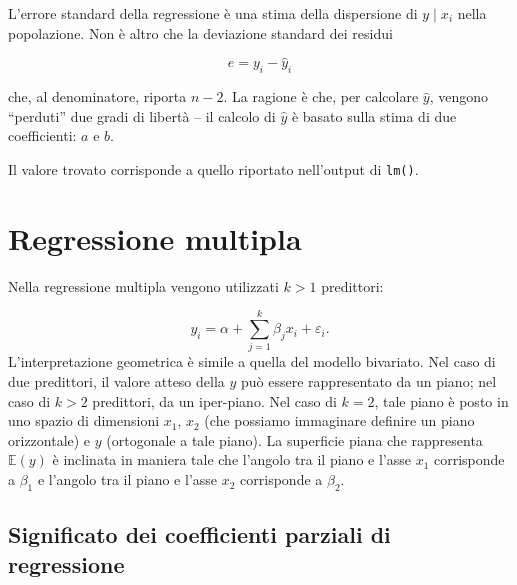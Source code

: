 \documentclass[
  11pt,
]{krantz}
\makeatletter
\newenvironment{Shaded}{\begin{snugshade}}{\end{snugshade}}
\newcommand{\CommentTok}[1]{\textcolor[rgb]{0.37,0.37,0.37}{\textit{#1}}}
\newcommand{\DecValTok}[1]{\textcolor[rgb]{0.06,0.06,0.06}{#1}}
\newcommand{\FunctionTok}[1]{\textcolor[rgb]{0,0,0}{#1}}
\newcommand{\NormalTok}[1]{#1}
\newcommand{\OtherTok}[1]{\textcolor[rgb]{0.37,0.37,0.37}{#1}}
\newcommand{\SpecialCharTok}[1]{\textcolor[rgb]{0,0,0}{#1}}
\newenvironment{kframe}{%
\medskip{}
\setlength{\fboxsep}{.8em}
 \def\at@end@of@kframe{}%
 \ifinner\ifhmode%
  \def\at@end@of@kframe{\end{minipage}}%
  \begin{minipage}{\columnwidth}%
 \fi\fi%
 \def\FrameCommand##1{\hskip\@totalleftmargin \hskip-\fboxsep
 \colorbox{shadecolor}{##1}\hskip-\fboxsep
     \hskip-\linewidth \hskip-\@totalleftmargin \hskip\columnwidth}%
 \MakeFramed {\advance\hsize-\width
   \@totalleftmargin\z@ \linewidth\hsize
   \@setminipage}}%
 {\par\unskip\endMakeFramed%
 \at@end@of@kframe}
\renewenvironment{Shaded}{\begin{kframe}}{\end{kframe}}
\makeatother
\begin{document}
L'errore standard della regressione è una stima della dispersione di \(y \mid x_i\) nella popolazione. Non è altro che la deviazione standard dei residui

\[
e = y_i - \hat{y}_i
\]

che, al denominatore, riporta \(n-2\). La ragione è che, per calcolare \(\hat{y}\), vengono ``perduti'' due gradi di libertà -- il calcolo di \(\hat{y}\) è basato sulla stima di due coefficienti: \(a\) e \(b\).

\begin{Shaded}
\end{Shaded}

Il valore trovato corrisponde a quello riportato nell'output di \texttt{lm()}.

\hypertarget{regressione-multipla}{%
\section{Regressione multipla}\label{regressione-multipla}}

Nella regressione multipla vengono utilizzati \(k > 1\) predittori:

\[
y_i = \alpha + \sum_{j=1}^k \beta_j x_i + \varepsilon_i.
\] L'interpretazione geometrica è simile a quella del modello bivariato. Nel caso di due predittori, il valore atteso della \(y\) può essere rappresentato da un piano; nel caso di \(k > 2\) predittori, da un iper-piano. Nel caso di \(k=2\), tale piano è posto in uno spazio di dimensioni \(x_1\), \(x_2\) (che possiamo immaginare definire un piano orizzontale) e \(y\) (ortogonale a tale piano). La superficie piana che rappresenta \(\mathbb{E}(y)\) è inclinata in maniera tale che l'angolo tra il piano e l'asse \(x_1\) corrisponde a \(\beta_1\) e l'angolo tra il piano e l'asse \(x_2\) corrisponde a \(\beta_2\).

\hypertarget{significato-dei-coefficienti-parziali-di-regressione}{%
\subsection{Significato dei coefficienti parziali di regressione}\label{significato-dei-coefficienti-parziali-di-regressione}}
\end{document}
